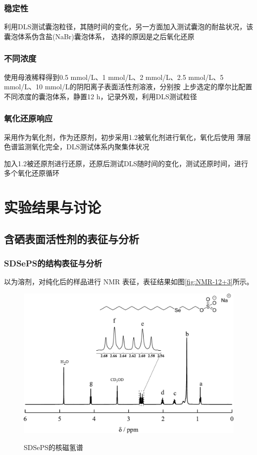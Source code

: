 \documentclass[bachelor,fandolfonts,replaceperiod]{jnuthesis}
\begin{document}
    \subsection{稳定性}
    利用DLS测试囊泡粒径，其随时间的变化，另一方面加入测试囊泡的耐盐状况，该囊泡体系伪含盐(NaBr)囊泡体系，
    选择的原因是之后氧化还原
    
    \subsection{不同浓度}
    使用母液稀释得到0.5 mmol/L、1 mmol/L、2 mmol/L、2.5 mmol/L、5 mmol/L、10 mmol/L的阴阳离子表面活性剂溶液，分别按
    上步选定的摩尔比配置不同浓度的囊泡体系，静置12 h，记录外观，利用DLS测试粒径
    
    \subsection{氧化还原响应}
    采用作为氧化剂，作为还原剂，初步采用1.2被氧化剂进行氧化，氧化后使用
    薄层色谱监测氧化完全，DLS测试体系内聚集体状况
    
    加入1.2被还原剂进行还原，还原后测试DLS随时间的变化，测试还原时间，进行多个氧化还原循环
    
    
    \chapter{实验结果与讨论}\label{chapter:results}
    \section{含硒表面活性剂的表征与分析}
    \subsection{SDSePS的结构表征与分析}
    以为溶剂，对纯化后的样品进行     NMR 表征，表征结果如图\ref{fig:NMR-12+3}所示。
    \begin{figure}[htbp]
        \centering
        \includegraphics[width=.75\textwidth]{figure/SDSePS-nmr.pdf}\\
        \caption{SDSePS的核磁氢谱}\label{fig:SDSePS-nmr}
    \end{figure}
     
\end{document}
